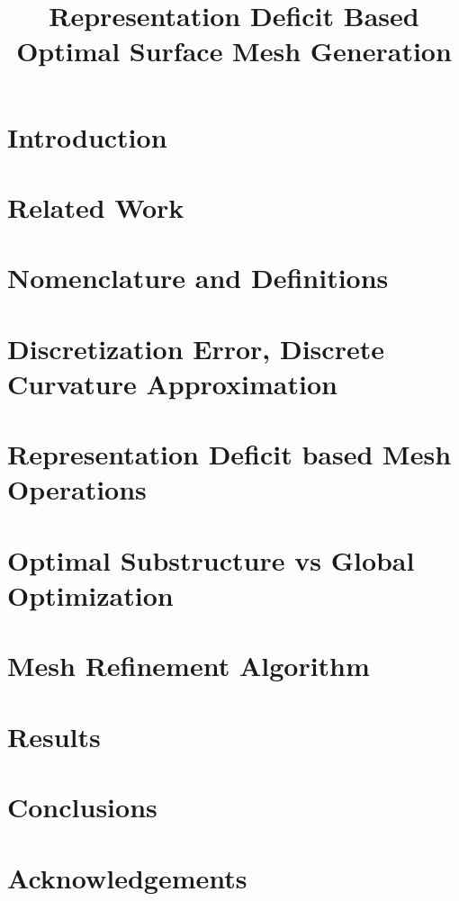 \documentclass[11pt]{article}
\begin{document}
\title{Representation Deficit Based Optimal Surface Mesh Generation}
\maketitle

\section{Introduction}


\section{Related Work}


\section{Nomenclature and Definitions}


\section{Discretization Error, Discrete Curvature Approximation}


\section{Representation Deficit based Mesh Operations}


\section{Optimal Substructure vs Global Optimization}


\section{Mesh Refinement Algorithm}


\section{Results}

\section{Conclusions}

\section{Acknowledgements}



\end{document}
